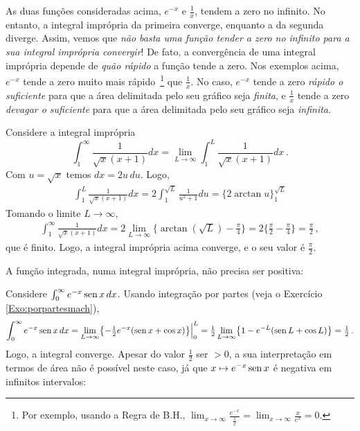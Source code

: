 \begin{obs}
As duas funções consideradas acima, $e^{-x}$ e $\frac1x$, tendem a zero
no infinito. 
No entanto, a integral imprópria da primeira converge, enquanto a da segunda
diverge.
Assim, vemos que \emph{não basta uma função tender a zero no infinito
para a sua integral imprópria convergir}!
De fato, a convergência de uma integral imprópria depende de \emph{quão
rápido} a função tende a zero.
Nos exemplos acima, $e^{-x}$ tende a zero muito mais rápido~\footnote{Por
exemplo, usando a Regra de B.H., 
$\lim_{x\to \infty}\frac{e^{-x}}{\tfrac1x}=\lim_{x\to
\infty}\frac{x}{e^{x}}=0$.} que
$\tfrac1x$.
No caso, $e^{-x}$ tende a zero \emph{rápido o suficiente} para que a área
delimitada pelo seu gráfico seja \emph{finita}, e $\tfrac1x$ tende a zero
\emph{devagar o suficiente} para que a área
delimitada pelo seu gráfico seja \emph{infinita}.
\end{obs}

\begin{ex}
Considere a integral imprópria
$$\int_1^\infty\frac{1}{\sqrt{x}(x+1)}dx=\lim_{L\to\infty}
\int_1^L\frac{1}{\sqrt{x}(x+1)}dx\,.$$
Com $u=\sqrt{x}$ temos $dx=2u\,du$. Logo,
\begin{align*}
\int_1^L\frac{1}{\sqrt{x}(x+1)}dx=2
\int_1^{\sqrt{L}}\frac{1}{u^2+1}du=\bigl\{2\arctan
u\big\}_1^{\sqrt{L}}
\end{align*}
Tomando o limite $L\to \infty$,
\begin{align*}
\int_1^\infty\frac{1}{\sqrt{x}(x+1)}dx=2\lim_{L\to\infty}\big\{
\arctan(\sqrt{L})-\tfrac{\pi}{4}
\big\}=
2\bigl\{\tfrac{\pi}{2}-\tfrac{\pi}{4}\bigr\}=\tfrac{\pi}{2}\,,
\end{align*}
que é finito. Logo, a integral imprópria acima {converge}, e o seu valor é
$\tfrac{\pi}{2}$.
\end{ex}

A função integrada, numa integral imprópria, não precisa ser positiva:
\begin{ex}
Considere $\int_0^\infty e^{-x}\operatorname{sen} x\,dx$. 
Usando integração por partes (veja o Exercício \ref{Exo:porpartesmach}),
$$\int_0^\infty e^{-x}\operatorname{sen} x\,dx=\lim_{L\to\infty}\bigl\{-\tfrac12 e^{-x}(\operatorname{sen}
x+\cos x)\bigr\}\Big|_0^L=\tfrac12
\lim_{L\to\infty}\bigl\{1-e^{-L}(\operatorname{sen}
L+\cos L)\bigr\}=\tfrac12\,.
$$
Logo, a integral converge. Apesar do valor $\frac12$ ser $>0$, a
sua interpretação em termos de área não é possível neste caso, já que 
$x\mapsto e^{-x}\operatorname{sen} x$ é negativa em infinitos intervalos:
\begin{center}
\begin{bmlimage}\end{bmlimage}
\end{center}
\end{ex}

